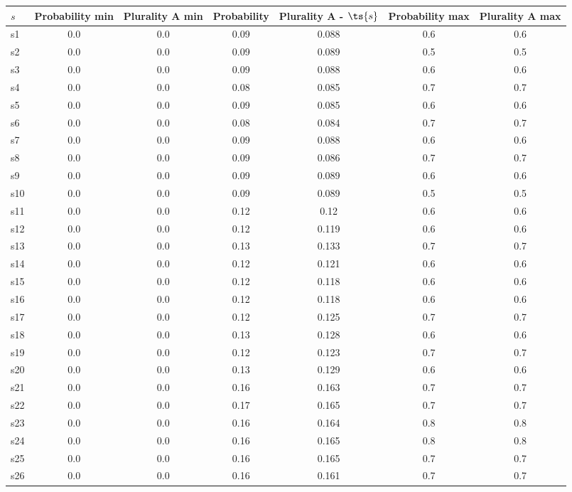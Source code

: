 \documentclass{article}
\begin{document}
\noindent\begin{tabular}{|l|c|c|c|c|c|c|}
\hline
$s$& Probability min & Plurality A min & Probability & Plurality A - $\ts{s}$ & Probability max & Plurality A max\\
\hline
s1 &0.0 & 0.0 & 0.09 & 0.088 & 0.6 & 0.6\\
\hline
s2 &0.0 & 0.0 & 0.09 & 0.089 & 0.5 & 0.5\\
\hline
s3 &0.0 & 0.0 & 0.09 & 0.088 & 0.6 & 0.6\\
\hline
s4 &0.0 & 0.0 & 0.08 & 0.085 & 0.7 & 0.7\\
\hline
s5 &0.0 & 0.0 & 0.09 & 0.085 & 0.6 & 0.6\\
\hline
s6 &0.0 & 0.0 & 0.08 & 0.084 & 0.7 & 0.7\\
\hline
s7 &0.0 & 0.0 & 0.09 & 0.088 & 0.6 & 0.6\\
\hline
s8 &0.0 & 0.0 & 0.09 & 0.086 & 0.7 & 0.7\\
\hline
s9 &0.0 & 0.0 & 0.09 & 0.089 & 0.6 & 0.6\\
\hline
s10 &0.0 & 0.0 & 0.09 & 0.089 & 0.5 & 0.5\\
\hline
s11 &0.0 & 0.0 & 0.12 & 0.12 & 0.6 & 0.6\\
\hline
s12 &0.0 & 0.0 & 0.12 & 0.119 & 0.6 & 0.6\\
\hline
s13 &0.0 & 0.0 & 0.13 & 0.133 & 0.7 & 0.7\\
\hline
s14 &0.0 & 0.0 & 0.12 & 0.121 & 0.6 & 0.6\\
\hline
s15 &0.0 & 0.0 & 0.12 & 0.118 & 0.6 & 0.6\\
\hline
s16 &0.0 & 0.0 & 0.12 & 0.118 & 0.6 & 0.6\\
\hline
s17 &0.0 & 0.0 & 0.12 & 0.125 & 0.7 & 0.7\\
\hline
s18 &0.0 & 0.0 & 0.13 & 0.128 & 0.6 & 0.6\\
\hline
s19 &0.0 & 0.0 & 0.12 & 0.123 & 0.7 & 0.7\\
\hline
s20 &0.0 & 0.0 & 0.13 & 0.129 & 0.6 & 0.6\\
\hline
s21 &0.0 & 0.0 & 0.16 & 0.163 & 0.7 & 0.7\\
\hline
s22 &0.0 & 0.0 & 0.17 & 0.165 & 0.7 & 0.7\\
\hline
s23 &0.0 & 0.0 & 0.16 & 0.164 & 0.8 & 0.8\\
\hline
s24 &0.0 & 0.0 & 0.16 & 0.165 & 0.8 & 0.8\\
\hline
s25 &0.0 & 0.0 & 0.16 & 0.165 & 0.7 & 0.7\\
\hline
s26 &0.0 & 0.0 & 0.16 & 0.161 & 0.7 & 0.7\\

\end{tabular}
\end{document}
